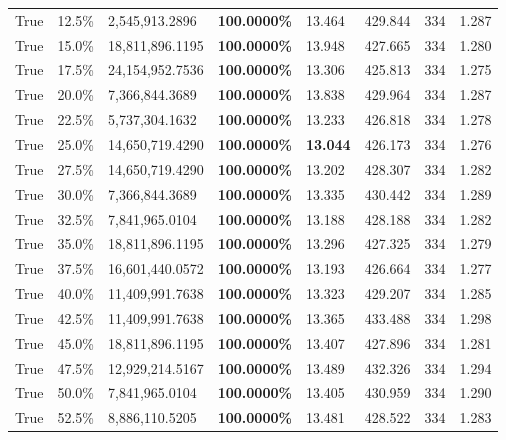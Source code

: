 \begin{table}[H]
\begin{tabular}{lllrllll}
\cline{1-8}
True & 12.5\% & 2,545,913.2896 & \bfseries \color{red} 100.0000\% & 13.464 & 429.844 & 334 & 1.287 \\
\cline{1-8}
True & 15.0\% & 18,811,896.1195 & \bfseries \color{red} 100.0000\% & 13.948 & 427.665 & 334 & 1.280 \\
\cline{1-8}
True & 17.5\% & 24,154,952.7536 & \bfseries \color{red} 100.0000\% & 13.306 & 425.813 & 334 & 1.275 \\
\cline{1-8}
True & 20.0\% & 7,366,844.3689 & \bfseries \color{red} 100.0000\% & 13.838 & 429.964 & 334 & 1.287 \\
\cline{1-8}
True & 22.5\% & 5,737,304.1632 & \bfseries \color{red} 100.0000\% & 13.233 & 426.818 & 334 & 1.278 \\
\cline{1-8}
True & 25.0\% & 14,650,719.4290 & \bfseries \color{red} 100.0000\% & \bfseries \color{red} 13.044 & 426.173 & 334 & 1.276 \\
\cline{1-8}
True & 27.5\% & 14,650,719.4290 & \bfseries \color{red} 100.0000\% & 13.202 & 428.307 & 334 & 1.282 \\
\cline{1-8}
True & 30.0\% & 7,366,844.3689 & \bfseries \color{red} 100.0000\% & 13.335 & 430.442 & 334 & 1.289 \\
\cline{1-8}
True & 32.5\% & 7,841,965.0104 & \bfseries \color{red} 100.0000\% & 13.188 & 428.188 & 334 & 1.282 \\
\cline{1-8}
True & 35.0\% & 18,811,896.1195 & \bfseries \color{red} 100.0000\% & 13.296 & 427.325 & 334 & 1.279 \\
\cline{1-8}
True & 37.5\% & 16,601,440.0572 & \bfseries \color{red} 100.0000\% & 13.193 & 426.664 & 334 & 1.277 \\
\cline{1-8}
True & 40.0\% & 11,409,991.7638 & \bfseries \color{red} 100.0000\% & 13.323 & 429.207 & 334 & 1.285 \\
\cline{1-8}
True & 42.5\% & 11,409,991.7638 & \bfseries \color{red} 100.0000\% & 13.365 & 433.488 & 334 & 1.298 \\
\cline{1-8}
True & 45.0\% & 18,811,896.1195 & \bfseries \color{red} 100.0000\% & 13.407 & 427.896 & 334 & 1.281 \\
\cline{1-8}
True & 47.5\% & 12,929,214.5167 & \bfseries \color{red} 100.0000\% & 13.489 & 432.326 & 334 & 1.294 \\
\cline{1-8}
True & 50.0\% & 7,841,965.0104 & \bfseries \color{red} 100.0000\% & 13.405 & 430.959 & 334 & 1.290 \\
\cline{1-8}
True & 52.5\% & 8,886,110.5205 & \bfseries \color{red} 100.0000\% & 13.481 & 428.522 & 334 & 1.283 \\

\end{tabular}
\end{table}
